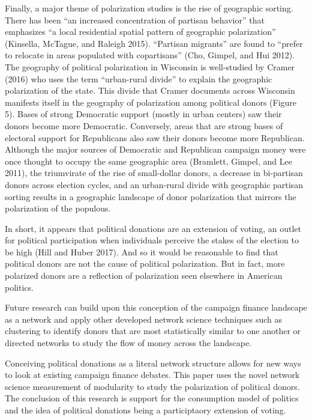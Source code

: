 \documentclass[12pt,]{article}
\begin{document}
Finally, a major theme of polarization studies is the rise of geographic
sorting. There has been ``an increased concentration of partisan
behavior'' that emphasizes ``a local residential spatial pattern of
geographic polarization'' (Kinsella, McTague, and Raleigh 2015).
``Partisan migrants'' are found to ``prefer to relocate in areas
populated with copartisans'' (Cho, Gimpel, and Hui 2012). The geography
of political polarization in Wisconsin is well-studied by Cramer (2016)
who uses the term ``urban-rural divide'' to explain the geographic
polarization of the state. This divide that Cramer documents across
Wisconsin manifests itself in the geography of polarization among
political donors (Figure 5). Bases of strong Democratic support (mostly
in urban centers) saw their donors become more Democratic. Conversely,
areas that are strong bases of electoral support for Republicans also
saw their donors become more Republican. Although the major sources of
Democratic and Republican campaign money were once thought to occupy the
same geographic area (Bramlett, Gimpel, and Lee 2011), the triumvirate
of the rise of small-dollar donors, a decrease in bi-partisan donors
across election cycles, and an urban-rural divide with geographic
partisan sorting results in a geographic landscape of donor polarization
that mirrors the polarization of the populous.

In short, it appears that political donations are an extension of
voting, an outlet for political participation when individuals perceive
the stakes of the election to be high (Hill and Huber 2017). And so it
would be reasonable to find that political donors are not the cause of
political polarization. But in fact, more polarized donors are a
reflection of polarization seen elsewhere in American politics.

Future research can build upon this conception of the campaign finance
landscape as a network and apply other developed network science
techniques such as clustering to identify donors that are most
statistically similar to one another or directed networks to study the
flow of money across the landscape.

Conceiving political donations as a literal network structure allows for
new ways to look at existing campaign finance debates. This paper uses
the novel network science measurement of modularity to study the
polarization of political donors. The conclusion of this research is
support for the consumption model of politics and the idea of political
donations being a participtaory extension of voting.
\end{document}
